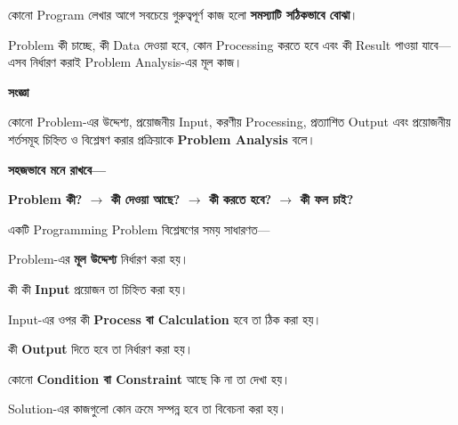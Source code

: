 
কোনো Program লেখার আগে সবচেয়ে গুরুত্বপূর্ণ কাজ হলো
\textbf{সমস্যাটি সঠিকভাবে বোঝা}।

Problem কী চাচ্ছে, কী Data দেওয়া হবে, কোন Processing করতে হবে
এবং কী Result পাওয়া যাবে—এসব নির্ধারণ করাই
Problem Analysis-এর মূল কাজ।


\begin{definitionbox}

\textbf{\color{darkTeal}সংজ্ঞা}

কোনো Problem-এর উদ্দেশ্য, প্রয়োজনীয় Input, করণীয় Processing,
প্রত্যাশিত Output এবং প্রয়োজনীয় শর্তসমূহ চিহ্নিত ও বিশ্লেষণ
করার প্রক্রিয়াকে \textbf{Problem Analysis} বলে।

\end{definitionbox}

\textbf{সহজভাবে মনে রাখবে—}

\begin{center}

\textbf{
Problem কী?
\(\longrightarrow\)
কী দেওয়া আছে?
\(\longrightarrow\)
কী করতে হবে?
\(\longrightarrow\)
কী ফল চাই?
}

\end{center}


একটি Programming Problem বিশ্লেষণের সময় সাধারণত—

\begin{compacttwocolpoints}

\item Problem-এর \textbf{মূল উদ্দেশ্য} নির্ধারণ করা হয়।

\item কী কী \textbf{Input} প্রয়োজন তা চিহ্নিত করা হয়।

\item Input-এর ওপর কী \textbf{Process বা Calculation} হবে তা ঠিক করা হয়।

\item কী \textbf{Output} দিতে হবে তা নির্ধারণ করা হয়।

\item কোনো \textbf{Condition বা Constraint} আছে কি না তা দেখা হয়।

\item Solution-এর কাজগুলো কোন ক্রমে সম্পন্ন হবে তা বিবেচনা করা হয়।

\end{compacttwocolpoints}

